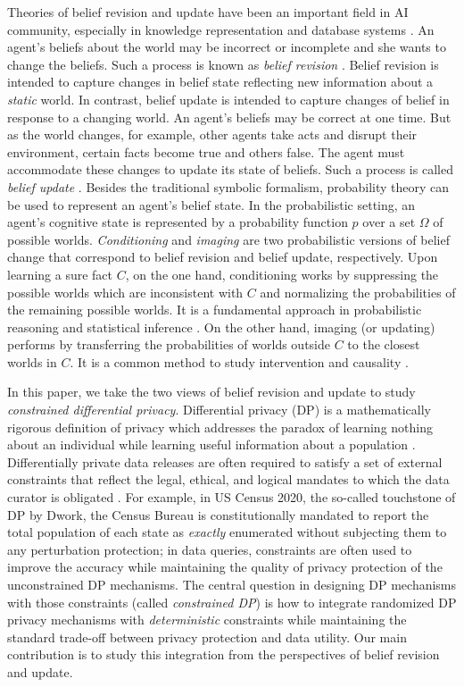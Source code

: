 \documentclass[11pt]{article}
\begin{document}
Theories of belief revision and update have been an important field in AI community, especially in knowledge representation and database systems \cite{FAI03}.  An agent's beliefs about the world may be incorrect or incomplete and she wants to change the beliefs.  Such a process is known as \emph{belief revision} \cite{AlchourronGM85}. 
Belief revision is intended to capture changes in belief state reflecting new information
about a \emph{static} world. In contrast, belief update is intended to capture changes of belief in response to a changing world. An agent's beliefs may be correct at one time. But as the world changes, for example, other agents take acts and disrupt their environment, certain facts become true and others false.  The agent must accommodate these changes to update its state of beliefs. Such a process is called \emph{belief update} \cite{KatsunoM91}.  Besides the traditional symbolic formalism, probability theory can be used to represent an agent's belief state. In the probabilistic setting, an agent's cognitive state is represented by a probability function $p$ over 
a set $\Omega$ of possible worlds. \emph{Conditioning} and \emph{imaging} are two probabilistic versions of belief change that correspond to belief revision and belief update, respectively.  Upon learning a sure fact $C$, on the one hand, conditioning works by suppressing the possible worlds which are inconsistent with $C$ and normalizing the probabilities of the remaining possible worlds. It is a fundamental approach in probabilistic reasoning and statistical inference \cite{Pearl88}. On the other hand, imaging (or updating) performs by transferring the probabilities of worlds outside $C$ to the closest worlds in $C$. It is a common method to study intervention and causality \cite{Pearl2009causality}.  

In this paper, we take the two views of belief revision and update to study \emph{constrained differential privacy}. Differential
privacy (DP) is a mathematically rigorous definition of privacy which addresses the paradox of learning nothing about an individual while learning useful information about a population \cite{DworkMNS06,DworkR14}.
Differentially private data releases are often required to satisfy a
set of external constraints that reflect the legal, ethical, and logical
mandates to which the data curator is obligated \cite{Abowd2019CensusTD,Hay2010boosting}.  For example, in US Census 2020, the so-called touchstone of DP by Dwork, the Census
Bureau is constitutionally mandated to report the total population of each state as \emph{exactly} enumerated without subjecting them to any perturbation protection;  in data queries, constraints are often used to improve the accuracy while maintaining the quality of privacy protection of the unconstrained DP mechanisms. 
The central question in designing DP mechanisms with those constraints (called \emph{constrained DP}) is how to integrate randomized DP privacy mechanisms with \emph{deterministic} constraints while maintaining the standard trade-off between privacy protection and data utility. Our main contribution  is to study this integration from the perspectives of belief revision and update.
\end{document}
